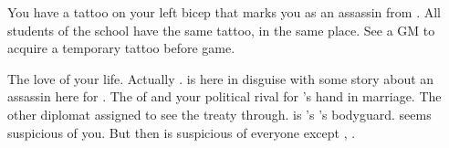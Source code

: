 \documentclass[char]{NeptuneBall}
\begin{document}
\begin{itemz}[Notes]
  \item You have a tattoo on your left bicep that marks you as an assassin from \pAssassin{}. All students of the school have the same tattoo, in the same place. See a GM to acquire a temporary tattoo before game.
\end{itemz}
\begin{contacts}
  \contact{\cPrincess{}} The love of your life.
  \contact{\cQueen{\MYname}} Actually \cQueen{}. \cQueen{\They} is here in disguise with some story about an assassin here for \cKing{\King} \cKing{}.
  \contact{\cPrince{}} The \cPrince{\prince} of \pPacifica{} and your political rival for \cPrincess{}'s hand in marriage.
  \contact{\cSpy{}} The other diplomat assigned to see the treaty through. \cSpy{} is \cBodyguard{}'s \cSpy{\sibling}
  \contact{\cBodyguard{}} \cPrince{}'s bodyguard. \cBodyguard{\They} seems suspicious of you. But then \cBodyguard{\they} is suspicious of everyone except \cBodyguard{\them} \cSpy{\sibling}, \cSpy{}.
\end{contacts}
\end{document}
